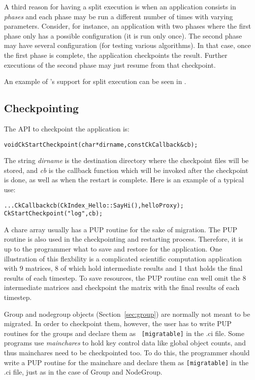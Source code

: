 A third reason for having a split execution is when an application
consists in \emph{phases} and each phase may be run a different number
of times with varying parameters. Consider, for instance, an
application with two phases where the first phase only has a possible
configuration (it is run only once). The second phase may have several
configuration (for testing various algorithms). In that case, once the
first phase is complete, the application checkpoints the
result. Further executions of the second phase may just resume from
that checkpoint.

An example of \charmpp{}'s support for split execution can be seen
in .

\subsection{Checkpointing}

\label{sec:diskcheckpoint}
	The API to checkpoint the application is:

\begin{alltt} 
  void CkStartCheckpoint(char* dirname,const CkCallback& cb);
\end{alltt}

The string {\it dirname} is the destination directory where the
checkpoint files will be stored, and {\it cb} is the callback function
which will be invoked after the checkpoint is done, as well as when
the restart is complete. Here is an example of a typical use:

\begin{alltt} 
  . . .  CkCallback cb(CkIndex_Hello::SayHi(),helloProxy);
  CkStartCheckpoint("log",cb);
\end{alltt}

A chare array usually has a PUP routine for the sake of migration.
The PUP routine is also used in the checkpointing and restarting
process.  Therefore, it is up to the programmer what to save and
restore for the application. One illustration of this flexbility is a
complicated scientific computation application with 9 matrices, 8 of
which hold intermediate results and 1 that holds the final results
of each timestep.  To save resources, the PUP routine can well omit
the 8 intermediate matrices and checkpoint the matrix with the final
results of each timestep.

Group and nodegroup objects (Section~\ref{sec:group}) are normally not
meant to be migrated. In order to checkpoint them, however, the user
has to write PUP routines for the groups and declare them as {\tt
[migratable]} in the .ci file. Some programs use {\it mainchares} to
hold key control data like global object counts, and thus mainchares
need to be checkpointed too. To do this, the programmer should write a
PUP routine for the mainchare and declare them as {\tt [migratable]}
in the .ci file, just as in the case of Group and NodeGroup.

